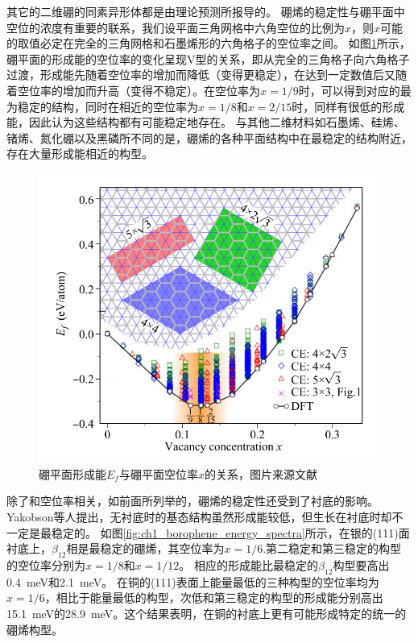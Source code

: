 其它的二维硼的同素异形体都是由理论预测所报导的\cite{liu2018intermixing, liu2013probing, penev2012polymorphism, zhang2017elasticity, zhao2016superconductivity, yang2008ab, zhang2016polyphony, tsafack2016thermomechanical, zhang2016substrate, ma2016graphene}。
硼烯的稳定性与硼平面中空位的浓度有重要的联系，我们设平面三角网格中六角空位的比例为$x$，则$x$可能的取值必定在完全的三角网格和石墨烯形的六角格子的空位率之间。
如图\ref{fig:ch1_formation_boronphenes}所示，硼平面的形成能的空位率的变化呈现V型的关系，即从完全的三角格子向六角格子过渡，形成能先随着空位率的增加而降低（变得更稳定），在达到一定数值后又随着空位率的增加而升高（变得不稳定）。在空位率为$x=1/9$时\cite{penev2012polymorphism}，可以得到对应的最为稳定的结构，同时在相近的空位率为$x=1/8$和$x=2/15$时，同样有很低的形成能，因此认为这些结构都有可能稳定地存在。
与其他二维材料如石墨烯、硅烯、锗烯、氮化硼以及黑磷所不同的是，硼烯的各种平面结构中在最稳定的结构附近，存在大量形成能相近的构型。

\begin{figure}[bt]
  \includegraphics[width=1.0\textwidth]{figs/ch1_formation_boronphenes.png}
  \centering
  \caption{硼平面形成能$E_f$与硼平面空位率$x$的关系，图片来源文献\cite{penev2012polymorphism}}
  \label{fig:ch1_formation_boronphenes}
\end{figure}

除了和空位率相关，如前面所列举的，硼烯的稳定性还受到了衬底的影响。
Yakobson等人提出\cite{zhang2015two}，无衬底时的基态结构虽然形成能较低，但生长在衬底时却不一定是最稳定的。
如图\ref{fig:ch1_borophene_energy_spectra}所示，在银的(111)面衬底上，$\beta_{12}$相是最稳定的硼烯，其空位率为$x=1/6$.第二稳定和第三稳定的构型的空位率分别为$x=1/8$和$x=1/12$。
相应的形成能比最稳定的$\beta_{12}$构型要高出\SI{0.4}{\meV}和\SI{2.1}{\meV}。
在铜的(111)表面上能量最低的三种构型的空位率均为$x=1/6$，相比于能量最低的构型，次低和第三稳定的构型的形成能分别高出\SI{15.1}{\meV}的\SI{28.9}{\meV}\cite{zhang2015two}。这个结果表明，在铜的衬底上更有可能形成特定的统一的硼烯构型。

